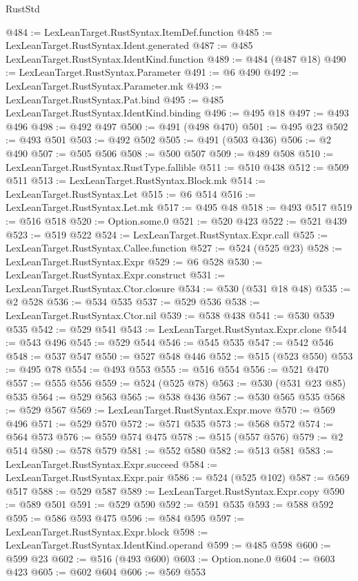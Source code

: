 \begin{lexlean}{RustStd}
\begin{coremodule}
@484 := LexLeanTarget.RustSyntax.ItemDef.function
@485 := LexLeanTarget.RustSyntax.Ident.generated
@487 := @485 LexLeanTarget.RustSyntax.IdentKind.function
@489 := @484 (@487 @18)
@490 := LexLeanTarget.RustSyntax.Parameter
@491 := @6 @490
@492 := LexLeanTarget.RustSyntax.Parameter.mk
@493 := LexLeanTarget.RustSyntax.Pat.bind
@495 := @485 LexLeanTarget.RustSyntax.IdentKind.binding
@496 := @495 @18
@497 := @493 @496
@498 := @492 @497
@500 := @491 (@498 @470)
@501 := @495 @23
@502 := @493 @501
@503 := @492 @502
@505 := @491 (@503 @436)
@506 := @2 @490
@507 := @505 @506
@508 := @500 @507
@509 := @489 @508
@510 := LexLeanTarget.RustSyntax.RustType.fallible
@511 := @510 @438
@512 := @509 @511
@513 := LexLeanTarget.RustSyntax.Block.mk
@514 := LexLeanTarget.RustSyntax.Let
@515 := @6 @514
@516 := LexLeanTarget.RustSyntax.Let.mk
@517 := @495 @48
@518 := @493 @517
@519 := @516 @518
@520 := Option.some.{0}
@521 := @520 @423
@522 := @521 @439
@523 := @519 @522
@524 := LexLeanTarget.RustSyntax.Expr.call
@525 := LexLeanTarget.RustSyntax.Callee.function
@527 := @524 (@525 @23)
@528 := LexLeanTarget.RustSyntax.Expr
@529 := @6 @528
@530 := LexLeanTarget.RustSyntax.Expr.construct
@531 := LexLeanTarget.RustSyntax.Ctor.closure
@534 := @530 (@531 @18 @48)
@535 := @2 @528
@536 := @534 @535
@537 := @529 @536
@538 := LexLeanTarget.RustSyntax.Ctor.nil
@539 := @538 @438
@541 := @530 @539 @535
@542 := @529 @541
@543 := LexLeanTarget.RustSyntax.Expr.clone
@544 := @543 @496
@545 := @529 @544
@546 := @545 @535
@547 := @542 @546
@548 := @537 @547
@550 := @527 @548 @446
@552 := @515 (@523 @550)
@553 := @495 @78
@554 := @493 @553
@555 := @516 @554
@556 := @521 @470
@557 := @555 @556
@559 := @524 (@525 @78)
@563 := @530 (@531 @23 @85) @535
@564 := @529 @563
@565 := @538 @436
@567 := @530 @565 @535
@568 := @529 @567
@569 := LexLeanTarget.RustSyntax.Expr.move
@570 := @569 @496
@571 := @529 @570
@572 := @571 @535
@573 := @568 @572
@574 := @564 @573
@576 := @559 @574 @475
@578 := @515 (@557 @576)
@579 := @2 @514
@580 := @578 @579
@581 := @552 @580
@582 := @513 @581
@583 := LexLeanTarget.RustSyntax.Expr.succeed
@584 := LexLeanTarget.RustSyntax.Expr.pair
@586 := @524 (@525 @102)
@587 := @569 @517
@588 := @529 @587
@589 := LexLeanTarget.RustSyntax.Expr.copy
@590 := @589 @501
@591 := @529 @590
@592 := @591 @535
@593 := @588 @592
@595 := @586 @593 @475
@596 := @584 @595
@597 := LexLeanTarget.RustSyntax.Expr.block
@598 := LexLeanTarget.RustSyntax.IdentKind.operand
@599 := @485 @598
@600 := @599 @23
@602 := @516 (@493 @600)
@603 := Option.none.{0}
@604 := @603 @423
@605 := @602 @604
@606 := @569 @553

\end{coremodule}
\end{lexlean}
